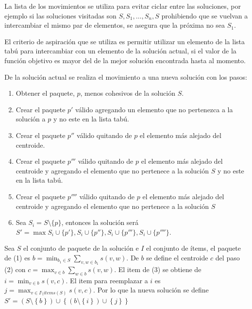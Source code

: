 La lista de los movimientos se utiliza para evitar ciclar entre las soluciones, por ejemplo si las soluciones visitadas son $S, S_1, \ldots, S_n, S$ prohibiendo que se vuelvan a intercambiar el mismo par de elementos, se asegura que la próxima no sea $S_1$.

El criterio de aspiración que se utiliza es permitir utilizar un elemento de la lista tabú para intercambiar con un elemento de la solución actual, si el valor de la función objetivo es mayor del de la mejor solución encontrada hasta al momento.

De la solución actual se realiza el movimiento a una nueva solución con los pasos:
\begin{enumerate}
	\item Obtener el paquete, $p$, menos cohesivos de la solución $S$.
	\item Crear el paquete $p'$ válido agregando un elemento que no pertenezca a la solución a $p$ y no este en la lista tabú.
	\item Crear el paquete $p''$ válido quitando de $p$ el elemento más alejado del centroide.
	\item Crear el paquete $p'''$ válido quitando de $p$ el elemento más alejado del centroide y agregando el elemento que no pertenece a la solución $S$ y no este en la lista tabú.
	\item Crear el paquete $p''''$ válido quitando de $p$ el elemento más alejado del centroide y agregando el elemento que no pertenece a la solución $S$
	\item Sea $S_{i} = S\setminus \{p\}$, entonces la solución será\\
	$S' = \max{S_{i}\cup\{p'\}, S_{i}\cup\{p''\}, S_{i}\cup\{p'''\}, S_{i}\cup\{p''''\}}$.
\end{enumerate}

Sea $S$ el conjunto de paquete de la solución e $I$ el conjunto de ítems, el paquete de (1) es $b = \min_{b_1 \in S}{\sum_{v,w \in b_1}{s(v,w)}}$. De $b$ se define el centroide $c$ del paso (2) con $c = \max_{v \in b}{\sum_{w \in b}{s(v,w)}}$. El item de (3) se obtiene de $i = \min_{v \in b}{s(v,c)}$. El item para reemplazar a $i$ es $j = \max_{v \in I \setminus items(S)}{s(v,c)}$. Por lo que la nueva solución se define $S' = (S \setminus \left\{b\right\}) \cup \left\{(b \setminus \left\{i\right\})\cup\left\{j\right\}\right\}$

